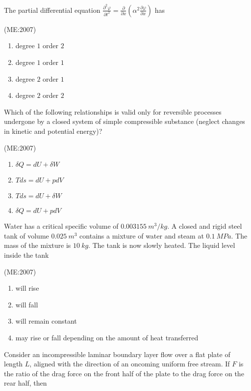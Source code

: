 \item The partial differential equation
$\frac{\partial^2 \varphi}{\partial t^2} = \frac{\partial}{\partial x} \left( \alpha^2 \frac{\partial \varphi}{\partial x} \right)$ has

		\hfill{(ME:2007)}
\begin{multicols}{2}
\begin{enumerate}
    \item degree $1$ order $2$
    \item degree $1$ order $1$
    \item degree $2$ order $1$
    \item degree $2$ order $2$
\end{enumerate}
\end{multicols}

\item Which of the following relationships is valid only for reversible processes undergone by a closed system of simple compressible substance (neglect changes in kinetic and potential energy)?

	\hfill{(ME:2007)}
		\begin{multicols}{2}
\begin{enumerate}
    \item $\delta Q = dU + \delta W$
    \item $T ds = dU + p dV$
    \item $T ds = dU + \delta W$
    \item $\delta Q = dU + p dV$
\end{enumerate}
\end{multicols}

\item Water has a critical specific volume of $0.003155 \ m^3/kg$. A closed and rigid steel tank of volume $0.025 \ m^3$ contains a mixture of water and steam at $0.1 \ MPa$. The mass of the mixture is $10 \ kg$. The tank is now slowly heated. The liquid level inside the tank

	\hfill{(ME:2007)}
	\begin{enumerate}
    \item will rise
    \item will fall
    \item will remain constant
    \item may rise or fall depending on the amount of heat transferred
\end{enumerate}

  \item Consider an incompressible laminar boundary layer flow over a flat plate of length $L$, aligned with the direction of an oncoming uniform free stream. If $F$ is the ratio of the drag force on the front half of the plate to the drag force on the rear half, then

